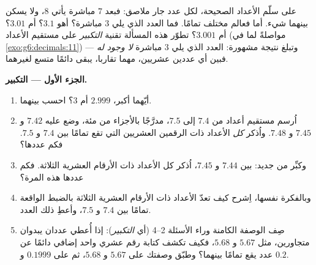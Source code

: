 \begin{problem}
\label{pb:g6:decimals:1}
على سلّم الأعداد الصحيحة، لكل عدد جار ملاصق:
فبعد $7$ مباشرة يأتي $8$، ولا يسكن بينهما شيء.
أما  فعالم مختلف تمامًا. فما
العدد الذي يلي $3$ مباشرة؟ أهو $3.1$؟ أم $3.01$؟ أم $3.001$؟ تطوّر هذه
المسألة تقنية \emph{التكبير} على مستقيم الأعداد
(مواصلةً لما في \cref{exo:g6:decimals:11}) وتبلغ نتيجة
مشهورة: العدد الذي يلي $3$ مباشرة \emph{لا وجود له} ---
فبين أي عددين عشريين، مهما تقاربا، يبقى دائمًا
متسع لغيرهما.

\medskip
\noindent\textbf{الجزء الأول --- التكبير.}
\begin{enumerate}
  \item أيّهما أكبر، $2.999$ أم $3$؟ احسب 
        بينهما.
  \item اُرسم مستقيم أعداد من $7.4$ إلى $7.5$، مدرَّجًا
        بالأجزاء من مئة، وضع عليه $7.42$ و $7.45$ و $7.48$.
        واُذكر \emph{كل} الأعداد ذات الرقمين العشريين التي
        تقع تمامًا بين $7.4$ و $7.5$. فكم عددها؟
  \item وكبِّر من جديد: بين $7.44$ و $7.45$، اُذكر كل
        الأعداد ذات الأرقام العشرية الثلاثة. فكم عددها
        هذه المرة؟
  \item وبالفكرة نفسها، اِشرح كيف تعدّ الأعداد
        ذات الأرقام العشرية الثلاثة بالضبط الواقعة تمامًا بين
        $7.4$ و $7.5$، وأعطِ ذلك العدد.
  \item صِف الوصفة الكامنة وراء الأسئلة 2--4 (أي
        \emph{التكبير}): إذا أُعطي عددان يبدوان
        متجاورين، مثل $5.67$ و $5.68$، فكيف تكشف كتابة
        رقم عشري واحد إضافي دائمًا عن عدد يقع تمامًا
        بينهما؟ وطبّق وصفتك على $5.67$ و $5.68$،
        ثم على $0.1999$ و $0.2$.
\end{enumerate}


\end{problem}
